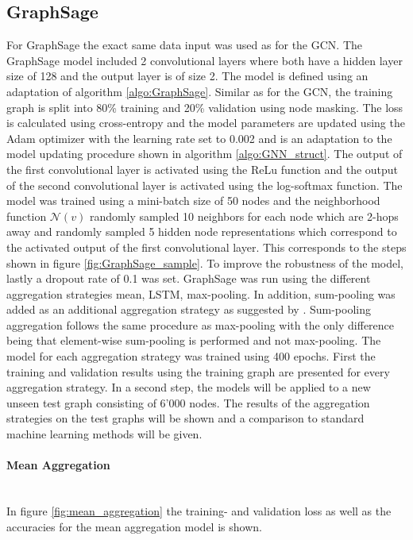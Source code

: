   \subsection{GraphSage}

  For GraphSage the exact same data input was used as for the GCN. The 
  GraphSage model included 2 convolutional layers where both have a hidden 
  layer size of 128 and the output layer is of size 2. The model is defined
  using an adaptation of algorithm \ref{algo:GraphSage}. Similar as for the 
  GCN, the training graph is split into 80\% training and 20\% validation using 
  node masking. The loss is calculated using cross-entropy and the model 
  parameters are updated using the Adam optimizer with the learning rate set to 
  0.002 and is an adaptation to the model updating procedure shown in 
  algorithm \ref{algo:GNN_struct}. The output of the first convolutional layer 
  is activated using the ReLu function and the output of the second 
  convolutional layer is activated using the log-softmax function. The model was 
  trained using a mini-batch size of 50 nodes and the neighborhood function 
  $\mathcal{N}(v)$ randomly sampled 10 neighbors for each node which are 2-hops 
  away and randomly sampled 5 hidden node representations which correspond to 
  the activated output of the first convolutional layer. This corresponds to 
  the steps shown in figure \ref{fig:GraphSage_sample}. To improve the 
  robustness of the model, lastly a dropout rate of 0.1 was set. GraphSage was 
  run using the different aggregation strategies mean, LSTM, max-pooling. In
  addition, sum-pooling was added as an additional aggregation strategy as
  suggested by \cite{xu2018powerful}. Sum-pooling aggregation follows the same
  procedure as max-pooling with the only difference being that element-wise
  sum-pooling is performed and not max-pooling. The model for each aggregation 
  strategy was trained using 400 epochs. First the training and validation
  results using the training graph are presented for every aggregation
  strategy. In a second step, the models will be applied to a new unseen test 
  graph consisting of 6'000 nodes. The results of the aggregation strategies on
  the test graphs will be shown and a comparison to standard machine learning
  methods will be given. 

  \paragraph{Mean Aggregation}  \mbox{}\\ 
  In figure \ref{fig:mean_aggregation} the training- and validation loss as
  well as the accuracies for the mean aggregation model is shown.

